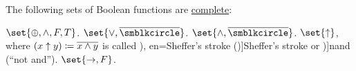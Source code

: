 \begin{proposition}\label{thm:complete_sets_of_boolean_functions}
  The following sets of Boolean functions are \hyperref[def:boolean_closure/complete]{complete}:
  \begin{thmenum}
     \( \set{ \oplus, \wedge, F, T } \).
     \( \set{ \vee, \oline{\anon} } \).
     \( \set{ \wedge, \oline{\anon} } \).
     \( \set{ \uparrow } \), where \( (x \uparrow y) \coloneqq \oline{x \wedge y} \) is called \term[ru=штрих Шеффера (\cite[29]{Эдельман1975Логика}), en=Sheffer's stroke (\cite[40]{Hinman2005Logic})]{Sheffer's stroke} or \term[en=nand (\cite[40]{Hinman2005Logic})]{nand} (\enquote{not and}).
     \( \set{ \rightarrow, F } \).
  \end{thmenum}
\end{proposition}

